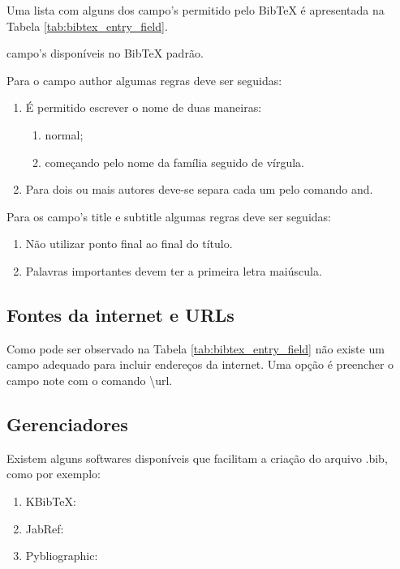 Uma lista com alguns dos \textsf{campo}'s permitido pelo BibTeX é apresentada na Tabela \ref{tab:bibtex_entry_field}.
\begin{table}[h!tb]
    \centering
    \caption{\textsf{campo}'s disponíveis no BibTeX padrão.}
    \label{tab:bibtex_entry_field}
    
\end{table}

Para o \textsf{campo} \textsf{author} algumas regras deve ser seguidas:
\begin{enumerate}
    \item É permitido escrever o nome de duas maneiras:
        \begin{enumerate}
            \item normal;
            \item começando pelo nome da família seguido de vírgula.
        \end{enumerate}
    \item Para dois ou mais autores deve-se separa cada um pelo comando \textsf{and}.
\end{enumerate}

Para os \textsf{campo}'s \textsf{title} e \textsf{subtitle} algumas regras deve ser seguidas:
\begin{enumerate}
    \item Não utilizar ponto final ao final do título.
    \item Palavras importantes devem ter a primeira letra maiúscula.
\end{enumerate}

\subsection{Fontes da internet e URLs}

Como pode ser observado na Tabela \ref{tab:bibtex_entry_field} não existe um \textsf{campo} adequado para incluir endereços da internet. Uma opção é preencher o \textsf{campo} \textsf{note} com o comando \textbackslash\textsf{url}.

\subsection{Gerenciadores}

Existem alguns softwares disponíveis que facilitam a criação do arquivo \textsf{.bib}, como por exemplo:
\begin{enumerate}
    \item KBibTeX: 
    \item JabRef: 
    \item Pybliographic: 
\end{enumerate}


